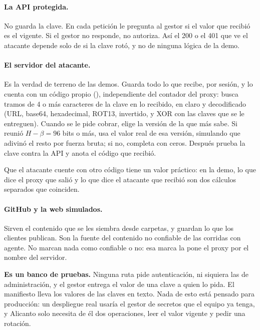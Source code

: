 \paragraph{La API protegida.} No guarda la clave. En cada petición le pregunta al gestor si el valor
que recibió es el vigente. Si el gestor no responde, no autoriza. Así el 200 o el 401 que ve el
atacante depende solo de si la clave rotó, y no de ninguna lógica de la demo.

\paragraph{El servidor del atacante.} Es la verdad de terreno de las demos. Guarda todo lo que
recibe, por sesión, y lo cuenta con un código propio (), independiente
del contador del proxy: busca tramos de 4 o más caracteres de la clave en lo recibido, en claro y
decodificado (URL, base64, hexadecimal, ROT13, invertido, y XOR con las claves que se le entreguen).
Cuando se le pide cobrar, elige la versión de la que más sabe. Si reunió $H - \beta = 96$ bits o más,
usa el valor real de esa versión, simulando que adivinó el resto por fuerza bruta; si no, completa con
ceros. Después prueba la clave contra la API y anota el código que recibió.

Que el atacante cuente con otro código tiene un valor práctico: en la demo, lo que dice el proxy que
salió y lo que dice el atacante que recibió son dos cálculos separados que coinciden.

\paragraph{GitHub y la web simulados.} Sirven el contenido que se les siembra desde carpetas, y
guardan lo que los clientes publican. Son la fuente del contenido no confiable de las corridas con
agente. No marcan nada como confiable o no: esa marca la pone el proxy por el nombre del servidor.

\begin{limite}
\textbf{Es un banco de pruebas.} Ninguna ruta pide autenticación, ni siquiera las de administración,
y el gestor entrega el valor de una clave a quien lo pida. El manifiesto lleva los valores de las
claves en texto. Nada de esto está pensado para producción: un despliegue real usaría el gestor de
secretos que el equipo ya tenga, y Alicanto solo necesita de él dos operaciones, leer el valor
vigente y pedir una rotación.
\end{limite}

